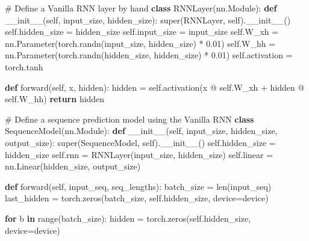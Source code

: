 \documentclass[
  letterpaper,
  DIV=11,
  numbers=noendperiod]{scrartcl}
\newenvironment{Shaded}{\begin{snugshade}}{\end{snugshade}}
\newcommand{\BuiltInTok}[1]{\textcolor[rgb]{0.00,0.23,0.31}{#1}}
\newcommand{\CommentTok}[1]{\textcolor[rgb]{0.37,0.37,0.37}{#1}}
\newcommand{\ControlFlowTok}[1]{\textcolor[rgb]{0.00,0.23,0.31}{\textbf{#1}}}
\newcommand{\FloatTok}[1]{\textcolor[rgb]{0.68,0.00,0.00}{#1}}
\newcommand{\FunctionTok}[1]{\textcolor[rgb]{0.28,0.35,0.67}{#1}}
\newcommand{\KeywordTok}[1]{\textcolor[rgb]{0.00,0.23,0.31}{\textbf{#1}}}
\newcommand{\NormalTok}[1]{\textcolor[rgb]{0.00,0.23,0.31}{#1}}
\newcommand{\OperatorTok}[1]{\textcolor[rgb]{0.37,0.37,0.37}{#1}}
\newcommand{\VariableTok}[1]{\textcolor[rgb]{0.07,0.07,0.07}{#1}}
\begin{document}
\begin{Shaded}
\begin{Highlighting}[]
\CommentTok{\# Define a Vanilla RNN layer by hand}
\KeywordTok{class}\NormalTok{ RNNLayer(nn.Module):}
    \KeywordTok{def} \FunctionTok{\_\_init\_\_}\NormalTok{(}\VariableTok{self}\NormalTok{, input\_size, hidden\_size):}
        \BuiltInTok{super}\NormalTok{(RNNLayer, }\VariableTok{self}\NormalTok{).}\FunctionTok{\_\_init\_\_}\NormalTok{()}
        \VariableTok{self}\NormalTok{.hidden\_size }\OperatorTok{=}\NormalTok{ hidden\_size}
        \VariableTok{self}\NormalTok{.input\_size }\OperatorTok{=}\NormalTok{ input\_size}
        \VariableTok{self}\NormalTok{.W\_xh }\OperatorTok{=}\NormalTok{ nn.Parameter(torch.randn(input\_size, hidden\_size) }\OperatorTok{*} \FloatTok{0.01}\NormalTok{)}
        \VariableTok{self}\NormalTok{.W\_hh }\OperatorTok{=}\NormalTok{ nn.Parameter(torch.randn(hidden\_size, hidden\_size) }\OperatorTok{*} \FloatTok{0.01}\NormalTok{)}
        \VariableTok{self}\NormalTok{.activation }\OperatorTok{=}\NormalTok{ torch.tanh}

    \KeywordTok{def}\NormalTok{ forward(}\VariableTok{self}\NormalTok{, x, hidden):}
\NormalTok{        hidden }\OperatorTok{=} \VariableTok{self}\NormalTok{.activation(x }\OperatorTok{@} \VariableTok{self}\NormalTok{.W\_xh }\OperatorTok{+}\NormalTok{ hidden }\OperatorTok{@} \VariableTok{self}\NormalTok{.W\_hh)}
        \ControlFlowTok{return}\NormalTok{ hidden}

\CommentTok{\# Define a sequence prediction model using the Vanilla RNN}
\KeywordTok{class}\NormalTok{ SequenceModel(nn.Module):}
    \KeywordTok{def} \FunctionTok{\_\_init\_\_}\NormalTok{(}\VariableTok{self}\NormalTok{, input\_size, hidden\_size, output\_size):}
        \BuiltInTok{super}\NormalTok{(SequenceModel, }\VariableTok{self}\NormalTok{).}\FunctionTok{\_\_init\_\_}\NormalTok{()}
        \VariableTok{self}\NormalTok{.hidden\_size }\OperatorTok{=}\NormalTok{ hidden\_size}
        \VariableTok{self}\NormalTok{.rnn }\OperatorTok{=}\NormalTok{ RNNLayer(input\_size, hidden\_size)}
        \VariableTok{self}\NormalTok{.linear }\OperatorTok{=}\NormalTok{ nn.Linear(hidden\_size, output\_size)}

    \KeywordTok{def}\NormalTok{ forward(}\VariableTok{self}\NormalTok{, input\_seq, seq\_lengths):}
\NormalTok{        batch\_size }\OperatorTok{=} \BuiltInTok{len}\NormalTok{(input\_seq)}
\NormalTok{        last\_hidden }\OperatorTok{=}\NormalTok{ torch.zeros(batch\_size, }\VariableTok{self}\NormalTok{.hidden\_size, device}\OperatorTok{=}\NormalTok{device)}

        \ControlFlowTok{for}\NormalTok{ b }\KeywordTok{in} \BuiltInTok{range}\NormalTok{(batch\_size):}
\NormalTok{            hidden }\OperatorTok{=}\NormalTok{ torch.zeros(}\VariableTok{self}\NormalTok{.hidden\_size, device}\OperatorTok{=}\NormalTok{device)}


\end{Highlighting}
\end{Shaded}
\end{document}
